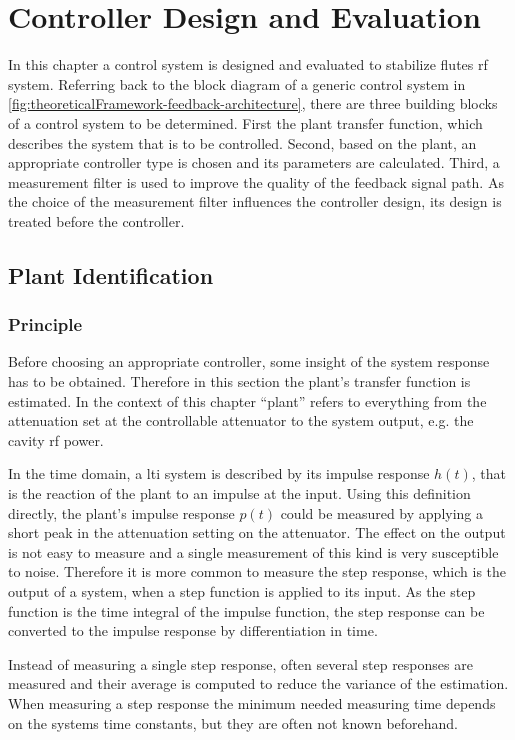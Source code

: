 \chapter{Controller Design and Evaluation}
In this chapter a control system is designed and evaluated to stabilize \glspl{flute} \gls{rf} system.
Referring back to the block diagram of a generic control system in \autoref{fig:theoreticalFramework-feedback-architecture}, there are three building blocks of a control system to be determined.
First the plant transfer function, which describes the system that is to be controlled.
Second, based on the plant, an appropriate controller type is chosen and its parameters are calculated.
Third, a measurement filter is used to improve the quality of the feedback signal path. As the choice of the measurement filter influences the controller design, its design is treated before the controller.

\section{Plant Identification}\label{sec:plantIdenti}
\subsection{Principle}
Before choosing an appropriate controller, some insight of the system response has to be obtained. Therefore in this section the plant's transfer function is estimated. In the context of this chapter ``plant'' refers to everything from the attenuation set at the controllable attenuator to the system output, e.g. the cavity \gls{rf} power.

In the time domain, a \gls{lti} system is described by its impulse response $h(t)$, that is the reaction of the plant to an impulse at the input.
Using this definition directly, the plant's impulse response $p(t)$ could be measured by applying a short peak in the attenuation setting on the attenuator. The effect on the output is not easy to measure and a single measurement of this kind is very susceptible to noise.
Therefore it is more common to measure the step response, which is the output of a system, when a step function is applied to its input. As the step function is the time integral of the impulse function, the step response can be converted to the impulse response by differentiation in time. \cite{Wang2000}

Instead of measuring a single step response, often several step responses are measured and their average is computed to reduce the variance of the estimation. When measuring a step response the minimum needed measuring time depends on the systems time constants, but they are often not known beforehand.

